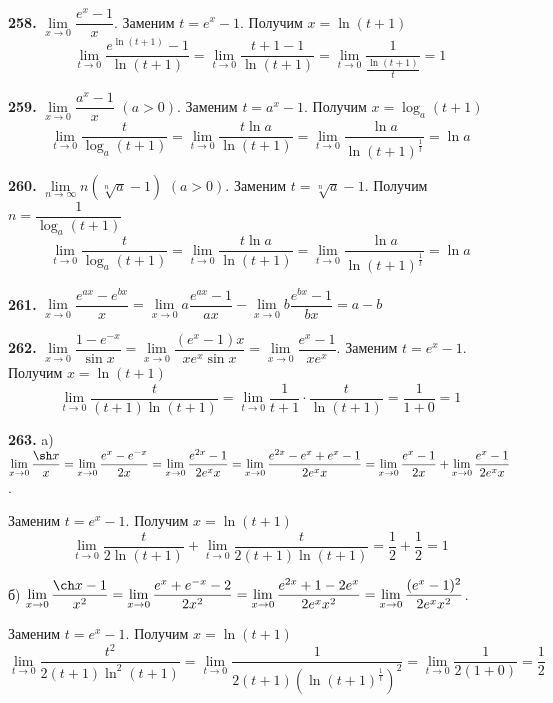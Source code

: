 \documentclass[12pt]{article}
\begin{document}
	\medskip
	{\bf 258.} $\lim\limits_{x\to0}\dfrac{e^x-1}{x}$. Заменим $t=e^x-1$. Получим $x=\ln(t+1)$
	\[
		\lim\limits_{t\to0}\dfrac{e^{\ln(t+1)}-1}{\ln(t+1)} = \lim\limits_{t\to0}\dfrac{t+1-1}{\ln(t+1)} = \lim\limits_{t\to0} \dfrac{1}{\frac{\ln(t+1)}{t}} =  1
	\]
	
	\medskip 
	{\bf 259.} $\lim\limits_{x\to0}\dfrac{a^x-1}{x}$ $(a>0)$. Заменим $t=a^x-1$. Получим $x=\log_a (t+1)$
	\[
		\lim\limits_{t\to0} \dfrac{t}{\log_a (t+1)} = \lim\limits_{t\to0} \dfrac{t\ln a}{\ln (t+1)} = \lim\limits_{t\to0} \dfrac{\ln a}{\ln(t+1)^\frac{1}{t}} = \ln a
	\]
	
	\medskip
	{\bf 260.} $\lim\limits_{n\to\infty} n(\sqrt[n]{a}-1)$ $(a>0)$. Заменим $t=\sqrt[n]{a}-1$. Получим $n = \dfrac{1}{\log_a(t+1)}$
	\[
		\lim\limits_{t\to0}\dfrac{t}{\log_a(t+1)} = \lim\limits_{t\to0} \dfrac{t\ln a}{\ln (t+1)} = \lim\limits_{t\to0} \dfrac{\ln a}{\ln(t+1)^\frac{1}{t}} = \ln a
	\]
	
	\medskip
	{\bf 261.} $\lim\limits_{x\to0}\dfrac{e^{ax}-e^{bx}}{x} = \lim\limits_{x\to0}a\dfrac{e^{ax}-1}{ax}-\lim\limits_{x\to0}b\dfrac{e^{bx}-1}{bx} = a-b$
	
	\medskip
	{\bf 262.} $\lim\limits_{x\to0}\dfrac{1-e^{-x}}{\sin x} = \lim\limits_{x\to0} \dfrac{(e^x-1)x}{xe^x\sin x} = \lim\limits_{x\to0} \dfrac{e^x-1}{x e^x}$. Заменим $t=e^x-1$. Получим $x=\ln(t+1)$
	\[
		\lim\limits_{t\to0} \dfrac{t}{(t+1)\ln(t+1)} = \lim\limits_{t\to0} \dfrac{1}{t+1}\cdot\dfrac{t}{\ln(t+1)} = \dfrac{1}{1+0} = 1
	\]	
	
	\medskip
	{\bf 263.} a) $\lim\limits_{x\to0}\dfrac{\sh x}{x} = \lim\limits_{x\to0} \dfrac{e^x-e^{-x}}{2x} = \lim\limits_{x\to0} \dfrac{e^{2x}-1}{2e^{x}x} = 	\lim\limits_{x\to0} \dfrac{e^{2x}-e^x+e^x-1}{2e^x x} = 	\lim\limits_{x\to0} \dfrac{e^x-1}{2x}+	\lim\limits_{x\to0} \dfrac{e^x-1}{2e^x x}$. 
	
	\vspace{2mm}
	Заменим $t=e^x-1$. Получим $x=\ln(t+1)$
	\[
			\lim\limits_{t\to0}\dfrac{t}{2\ln(t+1)} + \lim\limits_{t\to0} \dfrac{t}{2(t+1)\ln(t+1)} = \dfrac{1}{2}+\dfrac{1}{2} = 1
	\]
	
	\medskip
	б) $\lim\limits_{x\to0}\dfrac{\ch x-1}{x^2} = \lim\limits_{x\to0} \dfrac{e^x+e^{-x}-2}{2x^2} = \lim\limits_{x\to0} \dfrac{e^{2x}+1-2e^x}{2e^x x^2} = \lim\limits_{x\to0} \dfrac{(e^x-1)^2}{2e^x x^2}$.
	
	\vspace{2mm}
	Заменим $t=e^x-1$. Получим $x=\ln(t+1)$
	\[
		\lim\limits_{t\to0}\dfrac{t^2}{2(t+1)\ln^2(t+1)} = \lim\limits_{t\to0} \dfrac{1}{2(t+1)(\ln(t+1)^{\frac{1}{t}})^2} = \lim\limits_{t\to0} \dfrac{1}{2(1+0)} = \dfrac{1}{2}
	\]
	
\end{document}
